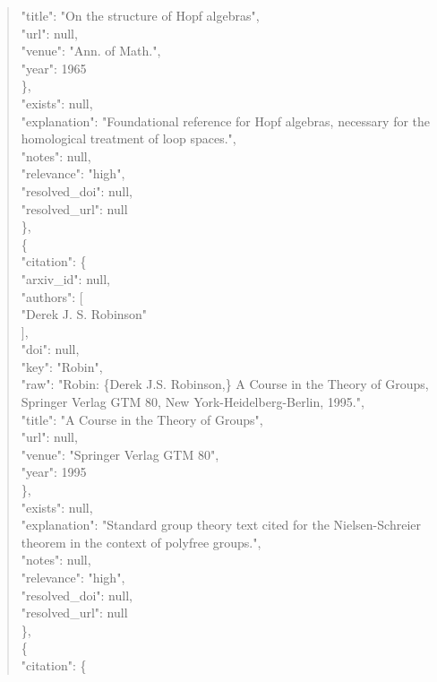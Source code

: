 \documentclass[11pt]{article}
\begin{document}
\begin{quote}
        "title": "On the structure of Hopf algebras",\\
        "url": null,\\
        "venue": "Ann. of Math.",\\
        "year": 1965\\
      \},\\
      "exists": null,\\
      "explanation": "Foundational reference for Hopf algebras, necessary for the homological treatment of loop spaces.",\\
      "notes": null,\\
      "relevance": "high",\\
      "resolved\_doi": null,\\
      "resolved\_url": null\\
    \},\\
    \{\\
      "citation": \{\\
        "arxiv\_id": null,\\
        "authors": [\\
          "Derek J. S. Robinson"\\
        ],\\
        "doi": null,\\
        "key": "Robin",\\
        "raw": "Robin: \{Derek J.S. Robinson,\} A Course in the Theory of Groups, Springer Verlag GTM 80, New York-Heidelberg-Berlin, 1995.",\\
        "title": "A Course in the Theory of Groups",\\
        "url": null,\\
        "venue": "Springer Verlag GTM 80",\\
        "year": 1995\\
      \},\\
      "exists": null,\\
      "explanation": "Standard group theory text cited for the Nielsen-Schreier theorem in the context of polyfree groups.",\\
      "notes": null,\\
      "relevance": "high",\\
      "resolved\_doi": null,\\
      "resolved\_url": null\\
    \},\\
    \{\\
      "citation": \{\\

\end{quote}
\end{document}
